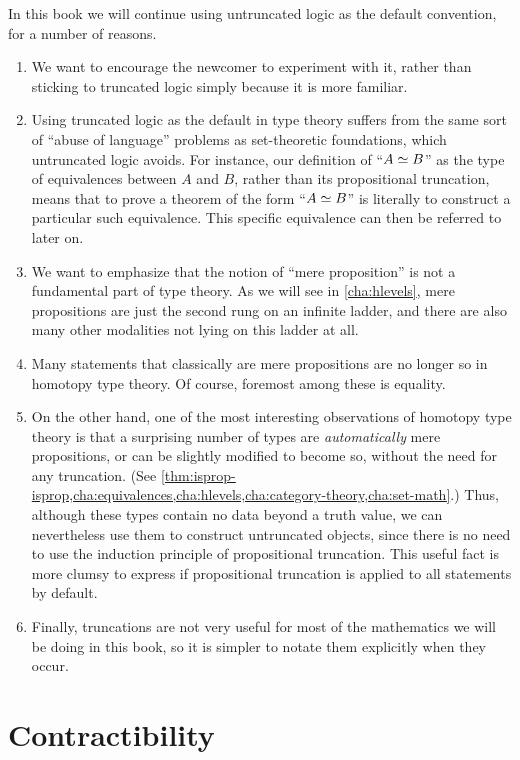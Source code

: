 In this book we will continue using untruncated logic as the default convention, for a number of reasons.
\begin{enumerate}[label=(\arabic*)]
\item We want to encourage the newcomer to experiment with it, rather than sticking to truncated logic simply because it is more familiar.
\item Using truncated logic as the default in type theory suffers from the same sort of ``abuse of language'' problems as set-theoretic foundations, which untruncated logic avoids.
  For instance, our definition of ``$A \simeq B$'' as the type of equivalences between $A$ and $B$, rather than its propositional truncation, means that to prove a theorem of the form ``$A \simeq B$'' is literally to construct a particular such equivalence.
  This specific equivalence can then be referred to later on.
\item We want to emphasize that the notion of ``mere proposition'' is not a fundamental part of type theory.
  As we will see in \cref{cha:hlevels}, mere propositions are just the second rung on an infinite ladder, and there are also many other modalities not lying on this ladder at all.
\item Many statements that classically are mere propositions are no longer so in homotopy type theory.
  Of course, foremost among these is equality.
\item On the other hand, one of the most interesting observations of homotopy type theory is that a surprising number of types are \emph{automatically} mere propositions, or can be slightly modified to become so, without the need for any truncation.
  (See \cref{thm:isprop-isprop,cha:equivalences,cha:hlevels,cha:category-theory,cha:set-math}.)
  Thus, although these types contain no data beyond a truth value, we can nevertheless use them to construct untruncated objects, since there is no need to use the induction principle of propositional truncation.
  This useful fact is more clumsy to express if propositional truncation is applied to all statements by default.
\item Finally, truncations are not very useful for most of the mathematics we will be doing in this book, so it is simpler to notate them explicitly when they occur.
\end{enumerate}

%
%

\section{Contractibility}
\label{sec:contractibility}


